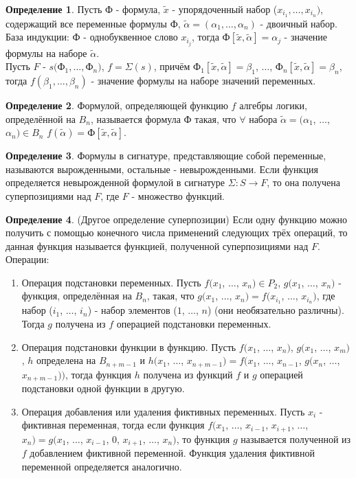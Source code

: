 \documentclass[a4paper, 12pt]{article}
\theoremstyle{definition}
\newtheorem*{definition}{Определение}
\theoremstyle{plain}
\theoremstyle{remark}
\begin{document}
  \begin{definition}
    Пусть Ф - формула, $\tilde{x}$ - упорядоченный набор ($x_{i_1}, \ldots, x_{i_n})$, содержащий все переменные формулы Ф, $\tilde{\alpha}=(\alpha_1, \ldots, \alpha_n)$ - двоичный набор.\\
    База индукции: Ф - однобуквенное слово $x_{i_j}$, тогда Ф$[\tilde{x}, \tilde{\alpha}]=\alpha_j$ - значение формулы на наборе $\tilde{\alpha}$.\\
    Пусть $F$ - $s($Ф$_1, \ldots, $Ф$_n)$, $f=\Sigma(s)$, причём Ф$_1[\tilde{x}, \tilde{\alpha}]=\beta_1$, $\ldots$, Ф$_n[\tilde{x}, \tilde{\alpha}]=\beta_n$, тогда $f(\beta_1, \ldots, \beta_n)$ - значение формулы на наборе значений переменных.
  \end{definition}
  \begin{definition}
    Формулой, определяющей функцию $f$ алгебры логики, определённой на $B_n$, называется формула Ф такая, что $\forall$ набора $\tilde{\alpha}=(\alpha_1$, $\ldots$, $\alpha_n)\in B_n$ $f(\tilde{\alpha})=$Ф$[\tilde{x}, \tilde{\alpha}]$.
  \end{definition}
  \begin{definition}
    Формулы в сигнатуре, представляющие собой переменные, называются вырожденными, остальные - невырожденными. Если функция определяется невырожденной формулой в сигнатуре $\Sigma:S \to F$, то она получена суперпозициями над $F$, где $F$ - множество функций.
  \end{definition}
  \begin{definition}
    (Другое определение суперпозиции) Если одну функцию можно получить с помощью конечного числа применений следующих трёх операций, то данная функция называется функцией, полученной суперпозициями над $F$.\\
    Операции:\\
    \begin{enumerate}
      \item Операция подстановки переменных. Пусть $f(x_1$, $\ldots$, $x_n)\in P_2$, $g(x_1$, $\ldots$, $x_n)$ - функция, определённая на $B_n$, такая, что $g(x_1$, $\ldots$, $x_n)=f(x_{i_1}$, $\ldots$, $x_{i_n})$, где набор ($i_1$, $\ldots$, $i_n$) - набор элементов ($1$, $\ldots$, $n$) (они необязательно различны). Тогда $g$ получена из $f$ операцией подстановки переменных.
      \item Операция подстановки функции в функцию. Пусть $f(x_1$, $\ldots$, $x_n)$, $g(x_1$, $\ldots$, $x_m)$, $h$ определена на $B_{n+m-1}$ и $h(x_1$, $\ldots$, $x_{n+m-1})=f(x_1$, $\ldots$, $x_{n-1}$, $g(x_n$, $\ldots$, $x_{n+m-1}))$, тогда функция $h$ получена из функций $f$ и $g$ операцией подстановки одной функции в другую.
      \item Операция добавления или удаления фиктивных переменных. Пусть $x_i$ - фиктивная переменная, тогда если функция $f(x_1$, $\ldots$, $x_{i-1}$, $x_{i+1}$, $\ldots$, $x_n)=g(x_1$, $\ldots$, $x_{i-1}$, $0$, $x_{i+1}$, $\ldots$, $x_n)$, то функция $g$ называется полученной из $f$ добавлением фиктивной переменной. Функция удаления фиктивной переменной определяется аналогично.
    \end{enumerate}
  \end{definition}
\end{document}
